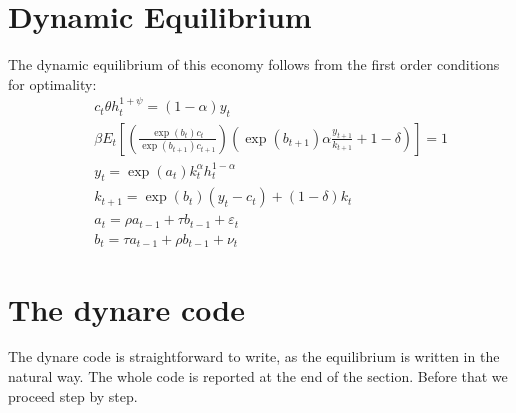 \documentclass[11pt,a4paper]{article}
\begin{document}
\section{Dynamic Equilibrium}
The dynamic equilibrium of this economy follows from the first order conditions for optimality:
\begin{eqnarray*}
&&c_t \theta h_t^{1+\psi}=(1-\alpha) y_t \\
&&\beta E_t\left[\left(\frac{\exp(b_t) c_t}{\exp(b_{t+1})c_{t+1}}\right)\left(\exp(b_{t+1})\alpha \frac{y_{t+1}}{k_{t+1}}+1-\delta\right)\right]=1\\
&&y_t=\exp(a_t) k_t^\alpha h_t^{1-\alpha} \\
&&k_{t+1}=\exp(b_t)(y_t-c_t)+(1-\delta)k_t \\
&&a_t=\rho a_{t-1}+\tau b_{t-1}+\varepsilon_t \\
&&b_t=\tau a_{t-1}+\rho b_{t-1}+\nu_t
\end{eqnarray*}
\section{The {\sc dynare} code}
The {\sc dynare} code is straightforward to write, as the equilibrium is written in the natural way. The whole code is reported at the end of the section. Before that we proceed step by step.
\end{document}
